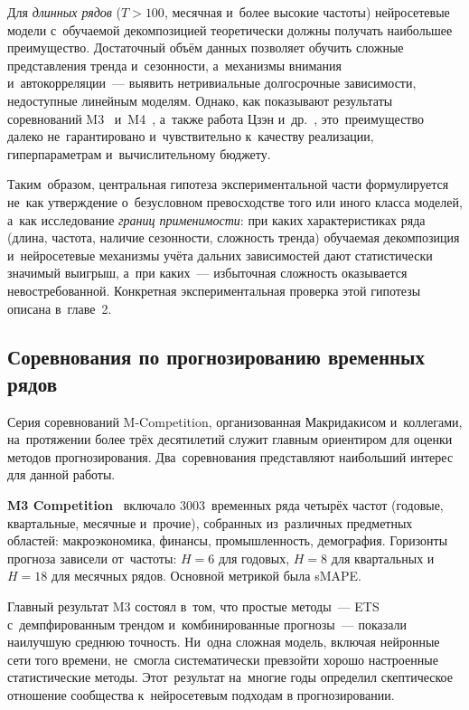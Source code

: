 Для \textit{длинных рядов} ($T > 100$, месячная и~более высокие
частоты) нейросетевые модели с~обучаемой декомпозицией теоретически
должны получать наибольшее преимущество.  Достаточный объём данных
позволяет обучить сложные представления тренда и~сезонности, а~механизмы
внимания и~автокорреляции~--- выявить нетривиальные долгосрочные
зависимости, недоступные линейным моделям.  Однако, как показывают
результаты соревнований M3~\cite{makridakis2000m3} и~M4~\cite{makridakis2020m4},
а~также работа Цзэн и~др.~\cite{zeng2023transformers}, это~преимущество
далеко не~гарантировано и~чувствительно к~качеству реализации,
гиперпараметрам и~вычислительному бюджету.

Таким~образом, центральная гипотеза экспериментальной части
формулируется не~как утверждение о~безусловном превосходстве того или
иного класса моделей, а~как исследование \textit{границ применимости}:
при каких характеристиках ряда (длина, частота, наличие сезонности,
сложность тренда) обучаемая декомпозиция и~нейросетевые механизмы учёта
дальних зависимостей дают статистически значимый выигрыш, а~при каких~---
избыточная сложность оказывается невостребованной.  Конкретная
экспериментальная проверка этой гипотезы описана в~главе~2.


\subsection{Соревнования по прогнозированию временных рядов}
\label{subsec:competitions}

Серия соревнований M-Competition, организованная Макридакисом
и~коллегами, на~протяжении более трёх десятилетий служит главным
ориентиром для оценки методов прогнозирования.  Два~соревнования
представляют наибольший интерес для данной работы.

\textbf{M3 Competition}~\cite{makridakis2000m3} включало 3003~временных
ряда четырёх частот (годовые, квартальные, месячные и~прочие),
собранных из~различных предметных областей: макроэкономика, финансы,
промышленность, демография.  Горизонты прогноза зависели от~частоты:
$H = 6$ для годовых, $H = 8$ для квартальных и~$H = 18$ для месячных
рядов.  Основной метрикой была sMAPE.

Главный результат M3 состоял в~том, что простые методы~--- ETS
с~демпфированным трендом и~комбинированные прогнозы~--- показали
наилучшую среднюю точность.  Ни~одна сложная модель, включая нейронные
сети того времени, не~смогла систематически превзойти хорошо настроенные
статистические методы.  Этот~результат на~многие годы определил
скептическое отношение сообщества к~нейросетевым подходам в
прогнозировании.

